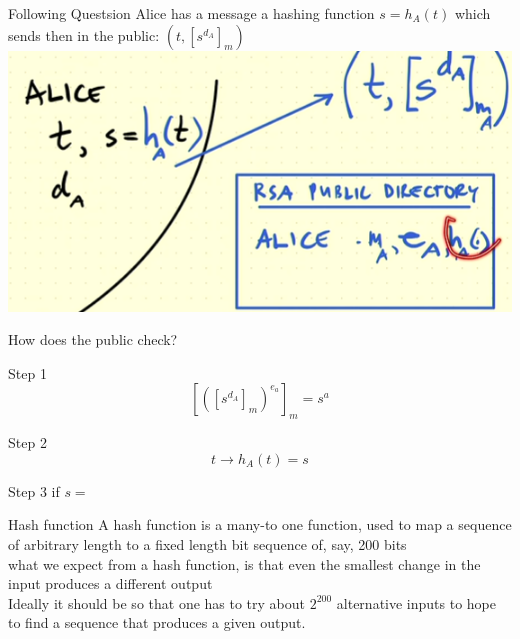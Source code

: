 \begin{parag}{Following Questsion}
    Alice has a message  a hashing function $s = h_A\left(t\right)$ which sends then in the public: $\left(t, \left[s^{d_A}\right]_m\right)$
    \includegraphics[scale=0.7]{22025-04-16.png}

\end{parag}
\begin{parag}{How does the public check?}
    \begin{subparag}{Step 1}
        \begin{equation*} \left[\left(\left[s^{d_A}\right]_m\right)^{e_a}\right]_m = s^a \end{equation*}
    \end{subparag}
    \begin{subparag}{Step 2}
        \begin{equation*} t \to h_A\left(t\right) = s \end{equation*}
        
    \end{subparag}
    \begin{subparag}{Step 3}
        if $s = $
        
    \end{subparag}
    
\end{parag}
\begin{parag}{Hash function}
    A hash function is a many-to one function, used to map a sequence of arbitrary length to a fixed length bit sequence of, say, 200 bits\\
    what we expect from a hash function, is that even the smallest change in the input produces a different output\\
    Ideally it should be so that one has to try about $2^{200}$ alternative inputs to hope to find a sequence that produces a given output.
    
\end{parag}


